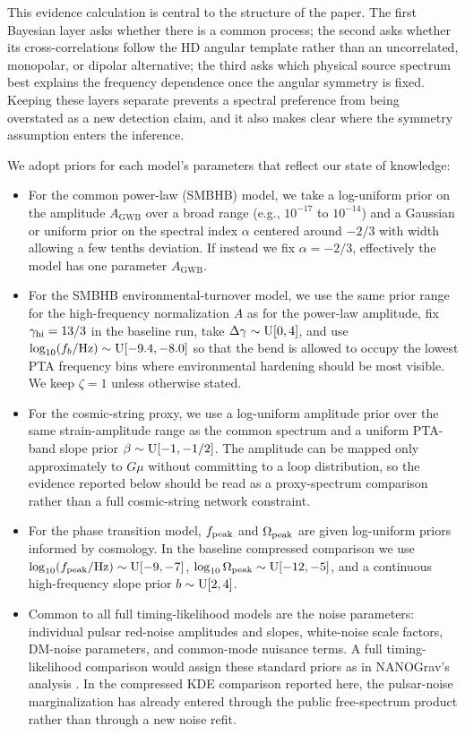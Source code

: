 \documentclass[symmetry,article,submit,pdftex,moreauthors]{Definitions/mdpi}
\begin{document}
This evidence calculation is central to the structure of the paper. The first Bayesian layer asks whether there is a common process; the second asks whether its cross-correlations follow the HD angular template rather than an uncorrelated, monopolar, or dipolar alternative; the third asks which physical source spectrum best explains the frequency dependence once the angular symmetry is fixed. Keeping these layers separate prevents a spectral preference from being overstated as a new detection claim, and it also makes clear where the symmetry assumption enters the inference.

We adopt priors for each model's parameters that reflect our state of knowledge:
\begin{itemize}
    \item For the common power-law (SMBHB) model, we take a log-uniform prior on the amplitude $A_{\mathrm{GWB}}$ over a broad range (e.g., $10^{-17}$ to $10^{-14}$) and a Gaussian or uniform prior on the spectral index $\alpha$ centered around $-2/3$ with width allowing a few tenths deviation. If instead we fix $\alpha=-2/3$, effectively the model has one parameter $A_{\mathrm{GWB}}$.
    \item For the SMBHB environmental-turnover model, we use the same prior range for the high-frequency normalization $A$ as for the power-law amplitude, fix $\gamma_{\rm hi}=13/3$ in the baseline run, take $\Delta\gamma\sim{\rm U}[0,4]$, and use $\log_{10}(f_b/{\rm Hz})\sim{\rm U}[-9.4,-8.0]$ so that the bend is allowed to occupy the lowest PTA frequency bins where environmental hardening should be most visible. We keep $\zeta=1$ unless otherwise stated.
    \item For the cosmic-string proxy, we use a log-uniform amplitude prior over the same strain-amplitude range as the common spectrum and a uniform PTA-band slope prior $\beta\sim{\rm U}[-1,-1/2]$. The amplitude can be mapped only approximately to $G\mu$ without committing to a loop distribution, so the evidence reported below should be read as a proxy-spectrum comparison rather than a full cosmic-string network constraint.
    \item For the phase transition model, $f_{\rm peak}$ and $\Omega_{\rm peak}$ are given log-uniform priors informed by cosmology. In the baseline compressed comparison we use $\log_{10}(f_{\rm peak}/{\rm Hz})\sim{\rm U}[-9,-7]$, $\log_{10}\Omega_{\rm peak}\sim{\rm U}[-12,-5]$, and a continuous high-frequency slope prior $b\sim{\rm U}[2,4]$.
    \item Common to all full timing-likelihood models are the noise parameters: individual pulsar red-noise amplitudes and slopes, white-noise scale factors, DM-noise parameters, and common-mode nuisance terms. A full timing-likelihood comparison would assign these standard priors as in NANOGrav's analysis \cite{NANOGrav15-Methods}. In the compressed KDE comparison reported here, the pulsar-noise marginalization has already entered through the public free-spectrum product rather than through a new noise refit.
\end{itemize}
\end{document}
